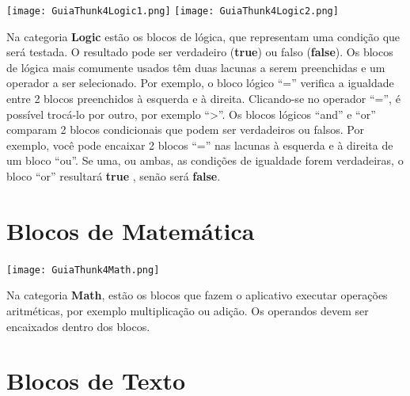 \documentclass[11pt,fleqn]{book} %
\begin{document}
\begin{minipage}{0.35\textwidth}
	\texttt{[image: GuiaThunk4Logic1.png]}
	\texttt{[image: GuiaThunk4Logic2.png]}
\end{minipage}
\hfill
\begin{minipage}{0.6\textwidth}\raggedright
	Na categoria \textbf{Logic}  estão os blocos de lógica, que representam uma condição que será testada. O resultado pode ser verdadeiro (\textbf{true}) ou falso (\textbf{false}). Os blocos de lógica mais comumente usados têm duas lacunas a serem preenchidas e um operador a ser selecionado. Por exemplo, o bloco lógico ``='' verifica a igualdade entre 2 blocos preenchidos à esquerda e à direita. Clicando-se no operador ``='', é possível trocá-lo por outro, por exemplo ``>''. Os blocos lógicos ``and'' e ``or'' comparam 2 blocos condicionais que podem	ser verdadeiros ou falsos. Por exemplo, você pode encaixar 2 blocos ``='' nas lacunas à esquerda e à direita de um bloco ``ou''. Se uma, ou ambas, as condições de igualdade forem verdadeiras, o bloco ``or'' resultará \textbf{true} , senão será \textbf{false}.
\end{minipage}


\section{Blocos de Matemática}

\begin{minipage}{0.35\textwidth}
	\texttt{[image: GuiaThunk4Math.png]}
\end{minipage}
\hfill
\begin{minipage}{0.6\textwidth}\raggedright
	Na categoria \textbf{Math}, estão os blocos que fazem o aplicativo
	executar operações aritméticas, por exemplo multiplicação ou adição. Os operandos devem ser encaixados dentro dos blocos.
\end{minipage}


\section{Blocos de Texto}
\end{document}
